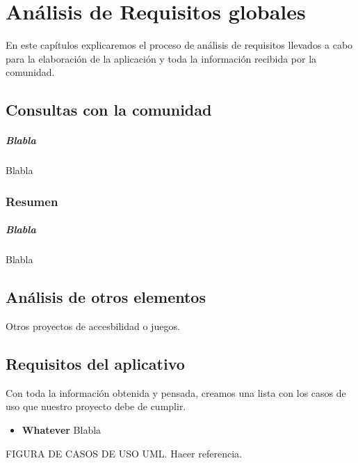 \chapter[Análisis de Requisitos]{Análisis de Requisitos globales}

En este capítulos explicaremos el proceso de análisis de requisitos llevados a cabo para la elaboración de la aplicación y toda la información recibida por la comunidad.

\section{Consultas con la comunidad}

\paragraph{Blabla} Blabla

\subsection{Resumen}
	\paragraph{Blabla} Blabla

\section{Análisis de otros elementos}
Otros proyectos de accesbilidad o juegos.

\section{Requisitos del aplicativo}
Con toda la información obtenida y pensada, creamos una lista con los casos de uso que nuestro proyecto debe de cumplir.

\begin{itemize}
  \item \textbf{Whatever} Blabla
\end{itemize}

FIGURA DE CASOS DE USO UML. Hacer referencia.

